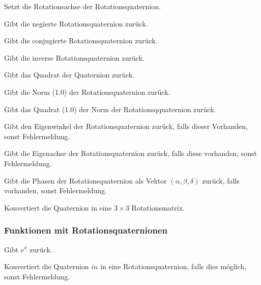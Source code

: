     \descr
    {
    	Setzt die Rotationsachse der Rotationsquaternion.
    }
 
 		\descr
 		{
 			 Gibt die negierte Rotationsquaternion zurück.
 		}
 		
 		\descr
 		{
 			 Gibt die conjugierte Rotationsquaternion zurück.
 		}
 		
 		\descr
 		{
 			 Gibt die inverse Rotationsquaternion zurück.
 		}
 			
 		\descr
 		{
 			 Gibt das Quadrat der Quaternion zurück.
 		}
 		
 		\descr
 		{
 			 Gibt die Norm (1.0) der Rotationsquaternion zurück.
 		}
 		
 		\descr
 		{
 			 Gibt das Quadrat (1.0) der Norm der Rotationsqquaternion zurück.
 		}
 		
 		\descr
 		{
 			 Gibt den Eigenwinkel der Rotationsquaternion zurück, falls dieser Vorhanden, sonst
 			 Fehlermeldung.
 		}
 		
 		\descr
 		{
 			 Gibt die Eigenachse der Rotationsquaternion zurück, falls diese vorhanden, sonst
 			 Fehlermeldung.
 		}
 		
 		\descr
 		{
 			 Gibt die Phasen der Rotationsquaternion als Vektor $(\alpha,\beta,\delta)$ zurück,
 			 falls vorhanden, sonst Fehlermeldung.
 		}
 		
 		\descr
 		{
 			 Konvertiert die Quaternion in eine $3\times 3$ Rotationsmatrix.
 		}
 		
 		
 	\subsubsection{Funktionen mit Rotationsquaternionen}
 		\descr
 		{
 			 Gibt $e^x$ zurück.
 		}
 		
 		\descr
 		{
 			Konvertiert die Quaternion $in$ in eine Rotationsquaternion, falls dies
 			möglich, sonst Fehlermeldung.
 		}
 		
